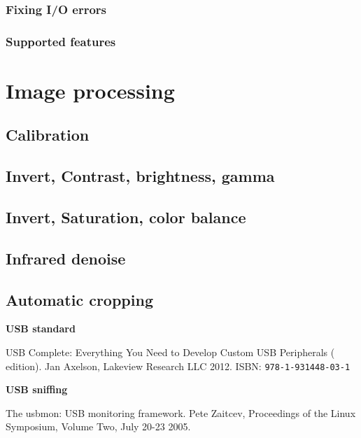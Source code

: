 \documentclass{article}
\begin{document}
\subsubsection{Fixing I/O errors}

\subsubsection{Supported features}

\section{Image processing}
\label{sec:imgproc}

\subsection{Calibration}

\subsection{Invert, Contrast, brightness, gamma}

\subsection{Invert, Saturation, color balance}

\subsection{Infrared denoise}

\subsection{Automatic cropping}

\pagebreak

\renewcommand{\refname}{References}
\begin{thebibliography}{}

  \item[]\hspace{-\labelwidth}\hspace{-\labelsep}\textbf{USB standard}

   USB Complete: Everything You Need to Develop
               Custom USB Peripherals ( edition).
               Jan Axelson, Lakeview Research LLC 2012.
               ISBN: {\tt   978-1-931448-03-1}
               
  \item[]\hspace{-\labelwidth}\hspace{-\labelsep}\textbf{USB sniffing}
  
   The usbmon: USB monitoring framework. Pete Zaitcev,
  Proceedings of the Linux Symposium, Volume Two, July 20-23 2005.
  \setcounter{firstbib}{\value{enumiv}}
\end{thebibliography}
\end{document}
